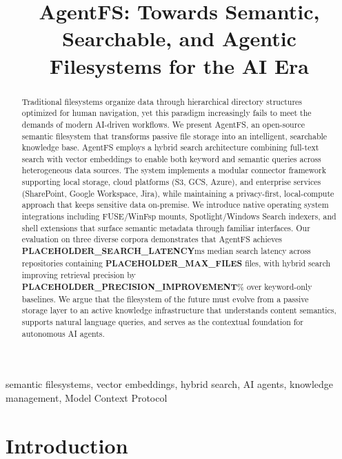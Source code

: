 \documentclass[conference]{IEEEtran}
\begin{document}
\title{AgentFS: Towards Semantic, Searchable, and Agentic Filesystems for the AI Era}

\author{
}

\maketitle

\begin{abstract}
Traditional filesystems organize data through hierarchical directory structures optimized for human navigation, yet this paradigm increasingly fails to meet the demands of modern AI-driven workflows. We present AgentFS, an open-source semantic filesystem that transforms passive file storage into an intelligent, searchable knowledge base. AgentFS employs a hybrid search architecture combining full-text search with vector embeddings to enable both keyword and semantic queries across heterogeneous data sources. The system implements a modular connector framework supporting local storage, cloud platforms (S3, GCS, Azure), and enterprise services (SharePoint, Google Workspace, Jira), while maintaining a privacy-first, local-compute approach that keeps sensitive data on-premise. We introduce native operating system integrations including FUSE/WinFsp mounts, Spotlight/Windows Search indexers, and shell extensions that surface semantic metadata through familiar interfaces. Our evaluation on three diverse corpora demonstrates that AgentFS achieves \textbf{PLACEHOLDER\_SEARCH\_LATENCY}ms median search latency across repositories containing \textbf{PLACEHOLDER\_MAX\_FILES} files, with hybrid search improving retrieval precision by \textbf{PLACEHOLDER\_PRECISION\_IMPROVEMENT}\% over keyword-only baselines. We argue that the filesystem of the future must evolve from a passive storage layer to an active knowledge infrastructure that understands content semantics, supports natural language queries, and serves as the contextual foundation for autonomous AI agents.
\end{abstract}

\begin{IEEEkeywords}
semantic filesystems, vector embeddings, hybrid search, AI agents, knowledge management, Model Context Protocol
\end{IEEEkeywords}

\section{Introduction}
\end{document}
